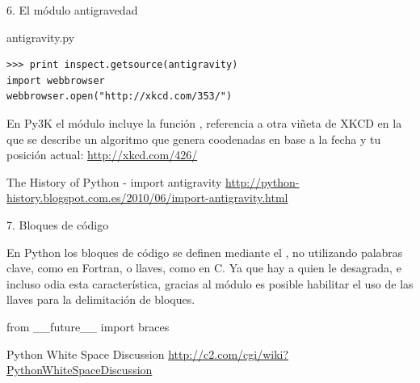 \documentclass[14pt]{beamer}
\begin{document}
\begin{frame}[fragile]{6. El módulo antigravedad}
  \begin{exampleblock}{\small antigravity.py}
    \small
    \begin{lstlisting}
>>> print inspect.getsource(antigravity)
import webbrowser
webbrowser.open("http://xkcd.com/353/")
    \end{lstlisting}
  \end{exampleblock}

  \begin{center}
     \small
     En Py3K el módulo  incluye la función
     , referencia a otra viñeta de XKCD en la que
     se describe un algoritmo que genera coodenadas en base a la fecha
     y tu posición actual: \url{http://xkcd.com/426/}
  \end{center}

  \small
  \begin{block}{\centering The History of Python - import antigravity}
    \centering
    \scriptsize
    \url{http://python-history.blogspot.com.es/2010/06/import-antigravity.html}
  \end{block}
\end{frame}

\begin{frame}{7. Bloques de código}
  \small
  \begin{center}
    En Python los bloques de código se definen mediante el
    , no utilizando palabras clave, como en
    Fortran, o llaves, como en C. Ya que hay a quien le desagrada, e
    incluso odia esta característica, gracias al módulo
     es posible habilitar el uso de las
    llaves para la delimitación de bloques.
  \end{center}

  \Large
  \begin{alertblock}{}
    \centering
    from \_\_future\_\_ import braces
  \end{alertblock}

  \vspace{0.5cm}

  \small
  \begin{block}{\centering Python White Space Discussion}
    \centering
    \url{http://c2.com/cgi/wiki?PythonWhiteSpaceDiscussion}
  \end{block}
\end{frame}
\end{document}
